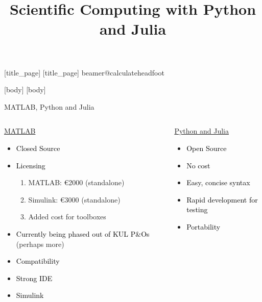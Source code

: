 \documentclass[11pt,t]{beamer}
\title{Scientific Computing with Python and Julia}
\begin{document}
	[title_page]
	[title_page]
	\csname beamer@calculateheadfoot\endcsname %
		\begin{frame}
			\titlepage
		\end{frame}
	[body]
	[body]


\begin{frame}[t]{MATLAB, Python and Julia}
	\begin{columns}[t]
		\begin{column}{.6\textwidth}
		\begin{center}
				\underline{MATLAB}
		\end{center}
		\begin{itemize}
			\item  \textcolor{black}{Closed Source}
			\item \textcolor{black}{Licensing}
				\begin{enumerate}
			\item  MATLAB: 	\euro 2000 (standalone)		
			\item Simulink: \euro 3000 (standalone)	
			\item Added cost for toolboxes
		\end{enumerate}
		\item \textcolor{black}{Currently being phased out of KUL P\&Os} (perhaps more)
		\item  \textcolor{black}{Compatibility}
		\item \textcolor{black}{Strong IDE}
		\item \textcolor{black}{Simulink}
		\end{itemize}
		\end{column}
		\begin{column}{.6\textwidth}
					\begin{center}
				 \underline{Python and Julia}
		\end{center}
		\begin{itemize}
			\item  \textcolor{black}{Open Source}
			\item \textcolor{black}{No cost}
			\item \textcolor{black}{Easy, concise syntax}
				\item \textcolor{black}{Rapid development for testing}
			\item \textcolor{black}{Portability}
		\end{itemize}
		\end{column}
	\end{columns}	
\end{frame}
\end{document}
